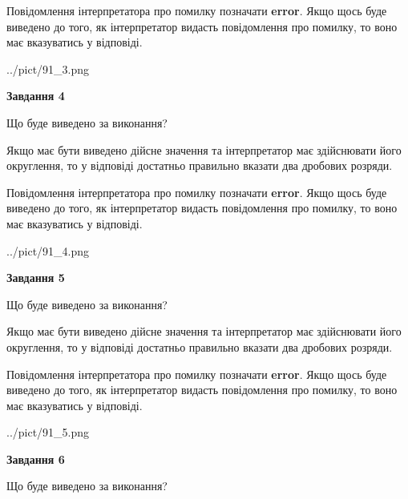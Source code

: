 \documentclass[12pt, ukrainian]{article}
\begin{document}
{\begin {Large}
Повідомлення інтерпретатора про помилку позначати \textbf{error}.
Якщо щось буде виведено до того, як інтерпретатор видасть повідомлення про помилку, 
то воно має вказуватись у відповіді. \par

\begin{center}
	{../pict/91_3.png}
\end{center}
\newpage

{\begin {center}\textbf{Завдання 4}\end {center}}\par
Що буде виведено за виконання? \par

Якщо має бути виведено дійсне значення та інтерпретатор має здійснювати його округлення, 
то у відповіді достатньо правильно вказати два дробових розряди.

Повідомлення інтерпретатора про помилку позначати \textbf{error}.
Якщо щось буде виведено до того, як інтерпретатор видасть повідомлення про помилку, 
то воно має вказуватись у відповіді. \par

\begin{center}
	{../pict/91_4.png}
\end{center}
\newpage

{\begin {center}\textbf{Завдання 5}\end {center}}\par
Що буде виведено за виконання? \par

Якщо має бути виведено дійсне значення та інтерпретатор має здійснювати його округлення, 
то у відповіді достатньо правильно вказати два дробових розряди.

Повідомлення інтерпретатора про помилку позначати \textbf{error}.
Якщо щось буде виведено до того, як інтерпретатор видасть повідомлення про помилку, 
то воно має вказуватись у відповіді. \par

\begin{center}
	{../pict/91_5.png}
\end{center}
\newpage

{\begin {center}\textbf{Завдання 6}\end {center}}\par
Що буде виведено за виконання? \par


\end{Large}}
\end{document}
